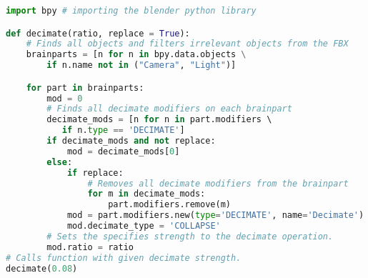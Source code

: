 \begin{lstlisting}[language=python, label={item:blenderscript}, caption={Blender script applying a decimate modifier to all relevant objects in a scene.}]
import bpy # importing the blender python library

def decimate(ratio, replace = True):
    # Finds all objects and filters irrelevant objects from the FBX 
    brainparts = [n for n in bpy.data.objects \
        if n.name not in ("Camera", "Light")] 

    for part in brainparts:
        mod = 0
        # Finds all decimate modifiers on each brainpart
        decimate_mods = [n for n in part.modifiers \ 
           if n.type == 'DECIMATE']
        if decimate_mods and not replace:
            mod = decimate_mods[0]
        else:
            if replace: 
                # Removes all decimate modifiers from the brainpart
                for m in decimate_mods:
                    part.modifiers.remove(m)
            mod = part.modifiers.new(type='DECIMATE', name='Decimate')
            mod.decimate_type = 'COLLAPSE'
        # Sets the specifies strength to the decimate operation. 
        mod.ratio = ratio
# Calls function with given decimate strength.
decimate(0.08)
\end{lstlisting}
